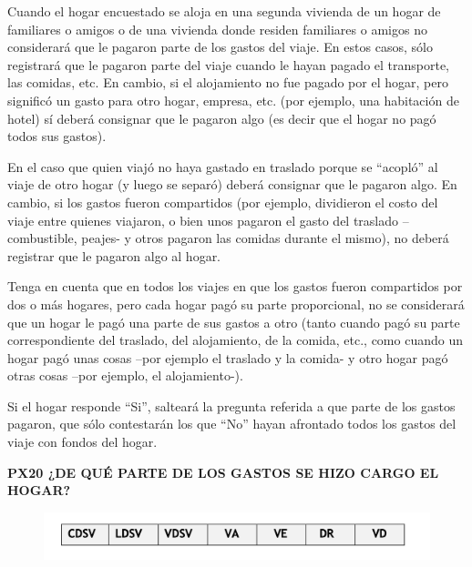 \documentclass[
  openany]{book}
\begin{document}
Cuando el hogar encuestado se aloja en una segunda vivienda de un hogar de familiares o amigos o de una vivienda donde residen familiares o amigos no considerará que le pagaron parte de los gastos del viaje. En estos casos, sólo registrará que le pagaron parte del viaje cuando le hayan pagado el transporte, las comidas, etc. En cambio, si el alojamiento no fue pagado por el hogar, pero significó un gasto para otro hogar, empresa, etc. (por ejemplo, una habitación de hotel) sí deberá consignar que le pagaron algo (es decir que el hogar no pagó todos sus gastos).

En el caso que quien viajó no haya gastado en traslado porque se ``acopló'' al viaje de otro hogar (y luego se separó) deberá consignar que le pagaron algo. En cambio, si los gastos fueron compartidos (por ejemplo, dividieron el costo del viaje entre quienes viajaron, o bien unos pagaron el gasto del traslado --combustible, peajes- y otros pagaron las comidas durante el mismo), no deberá registrar que le pagaron algo al hogar.

Tenga en cuenta que en todos los viajes en que los gastos fueron compartidos por dos o más hogares, pero cada hogar pagó su parte proporcional, no se considerará que un hogar le pagó una parte de sus gastos a otro (tanto cuando pagó su parte correspondiente del traslado, del alojamiento, de la comida, etc., como cuando un hogar pagó unas cosas --por ejemplo el traslado y la comida- y otro hogar pagó otras cosas --por ejemplo, el alojamiento-).

Si el hogar responde ``Si'', salteará la pregunta referida a que parte de los gastos pagaron, que sólo contestarán los que ``No'' hayan afrontado todos los gastos del viaje con fondos del hogar.

\textbf{PX20 ¿DE QUÉ PARTE DE LOS GASTOS SE HIZO CARGO EL HOGAR?}

\begin{figure}

{\centering \includegraphics[width=1\linewidth]{imagenes/figura6-119} 

}

\end{figure}
\end{document}

